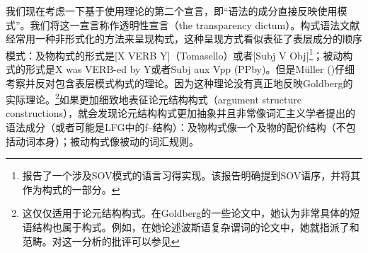     我们现在考虑一下基于使用理论的第二个宣言，即“语法的成分直接反映使用模式”。我们将这一宣言称作透明性宣言（the transparency dictum）。构式语法文献经常用一种非形式化的方法来呈现构式，这种呈现方式看似表征了表层成分的顺序模式：及物构式的形式是[X VERB Y]（Tomasello）或者[Subj V Obj]\citep{Goldberg95a,Goldberg2006a}\footnote{%
   \citet[]{GCS2004a}报告了一个涉及SOV模式的语言习得实现。该报告明确提到SOV语序，并将其作为构式的一部分。
}；被动构式的形式是X was VERB-ed by Y\citep[]{Tomasello2003a}或者Subj aux Vpp (PPby)\citep[]{Goldberg2006a}。但是Müller (\citeyear[\S~2]{Mueller2006d})仔细考察并反对包含表层模式构式的理论。因为这种理论没有真正地反映Goldberg的实际理论。\footnote{%
这仅仅适用于论元结构构式。在Goldberg的一些论文中，她认为非常具体的短语结构也属于构式。例如，在她论述波斯语复杂谓词的论文\citep{Goldberg2003a}中，她就指派了\vnullc 和\vbarc 范畴。对这一分析的批评可以参见 
}如果更加细致地表征论元结构构式（argument structure constructions），就会发现论元结构构式更加抽象并且非常像词汇主义学者提出的语法成分（或者可能是LFG中的f--结构）：及物构式像一个及物的配价结构（不包括动词本身）；被动构式像被动的词汇规则。

